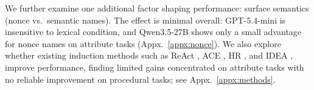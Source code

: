 \documentclass[11pt]{article}
\begin{document}
We further examine one additional factor shaping performance: surface semantics (nonce vs.\ semantic names). The effect is minimal overall: GPT-5.4-mini is insensitive to lexical condition, and Qwen3.5-27B shows only a small advantage for nonce names on attribute tasks (Appx.~\ref{appx:nonce}). We also explore whether existing induction methods such as ReAct \citep{yao2023react}, ACE \citep{zhang2026agentic}, HR \citep{qiu-etal-2024-phenomenal}, and IDEA \citep{he2024idea}, improve performance, finding limited gains concentrated on attribute tasks with no reliable improvement on procedural tasks; see Appx.~\ref{appx:methods}.














\end{document}
